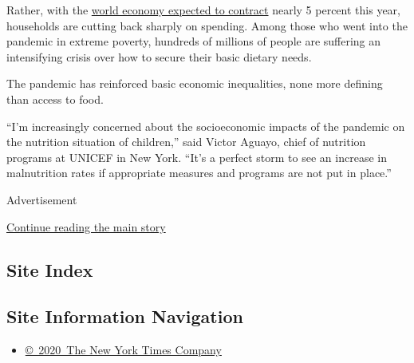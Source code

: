 Rather, with the
\href{https://www.imf.org/en/Publications/WEO/Issues/2020/06/24/WEOUpdateJune2020}{world
economy expected to contract} nearly 5 percent this year, households are
cutting back sharply on spending. Among those who went into the pandemic
in extreme poverty, hundreds of millions of people are suffering an
intensifying crisis over how to secure their basic dietary needs.

The pandemic has reinforced basic economic inequalities, none more
defining than access to food.

``I'm increasingly concerned about the socioeconomic impacts of the
pandemic on the nutrition situation of children,'' said Victor Aguayo,
chief of nutrition programs at UNICEF in New York. ``It's a perfect
storm to see an increase in malnutrition rates if appropriate measures
and programs are not put in place.''

Advertisement

\protect\hyperlink{after-bottom}{Continue reading the main story}

\hypertarget{site-index}{%
\subsection{Site Index}\label{site-index}}

\hypertarget{site-information-navigation}{%
\subsection{Site Information
Navigation}\label{site-information-navigation}}

\begin{itemize}
\tightlist
\item
  \href{https://help.nytimes3xbfgragh.onion/hc/en-us/articles/115014792127-Copyright-notice}{©~2020~The
  New York Times Company}
\end{itemize}

